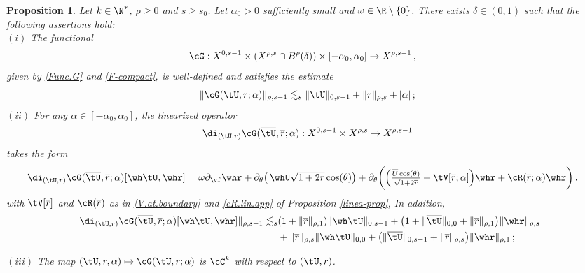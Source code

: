 \documentclass[a4paper,reqno,10pt]{article}
\newtheorem{pro}{Proposition}[section]
\newcommand{\pa}{\partial}
\begin{document}
\begin{pro}\label{prop-Functional-est}
	Let $k\in\N^*$, $\rho\geq 0$ and $s\geq s_0$. Let $\alpha_{0}>0$ sufficiently small and $\omega \in \R\setminus \{0\}$. There exists $\delta\in(0,1)$ such that the following assertions hold: 
	\\[1mm]
	\noindent $(i)$
	The functional
	\begin{equation*}
		\begin{aligned}
			&\cG: X^{0,s-1} \times (X^{\rho,s}\cap B^{\rho}(\delta)) \times [-\alpha_{0},\alpha_{0}] \to X^{\rho,s-1}\,, 
		\end{aligned}
	\end{equation*}
	given by  \eqref{Func.G} and \eqref{F-compact}, is well-defined and satisfies the estimate
	\begin{equation}
		\| \cG(\tU,r;\alpha) \|_{\rho,s-1} \lesssim_{s} \| \tU \|_{0,s-1} + \| r \|_{\rho,s} + |\alpha|  \,; 
	\end{equation}
	\noindent $(ii)$ For any $\alpha\in[-\alpha_{0},\alpha_{0}]$, the linearized  operator 
    $$
    \di_{(\tU,r)} \cG( \overline\tU, \overline{r}; \alpha) : X^{0,s-1} \times X^{\rho,s} \to X^{\rho,s-1}
    $$
    takes the form
	\begin{equation}
		\begin{aligned}
			&\di_{(\tU,r)} \cG( \overline\tU, \overline{r}; \alpha) [\wh\tU,\whr] =  \omega \pa_{\vf}\whr +  \pa_{\theta}\big( \,\whU\sqrt{1+2 r} \cos(\theta) \big) + \pa_{\theta}\bigg( \Big( \tfrac{ \overline{U} \cos(\theta)}{\sqrt{1+2 \overline{r}}} + \tV[ \overline{r};\alpha] \Big) \whr +  \cR(\overline{r};\alpha) \whr \bigg) \,,
		\end{aligned}
	\end{equation}
	with $\tV[\overline r]$ and $\cR(\overline r)$ as in \eqref{V.at.boundary} and \eqref{cR.lin.app} of Proposition \ref{linea-prop}, In addition, 
	\begin{align*}
		\| \di_{(\tU,r)} \cG( \overline\tU, \overline{r}; \alpha) [\wh\tU,\whr] \|_{\rho,s-1} \lesssim_{s} &(1+\| \overline r\|_{\rho,1}) \| \wh\tU \|_{0,s-1} + \big(1+ \| \overline \tU \|_{0,0} + \| \overline r \|_{\rho,1} \big)\| \whr \|_{\rho,s} \\
        &+\| \overline r\|_{\rho,s} \| \wh\tU \|_{0,0} + \big( \| \overline \tU \|_{0,s-1} + \| \overline r \|_{\rho,s} \big)\| \whr \|_{\rho,1}\,;
	\end{align*}

	\noindent $(iii)$ The map $(\tU,r,\alpha) \mapsto \cG(\tU,r;\alpha)$ is $\cC^k$ with respect to $(\tU,r)$.
\end{pro}
\end{document}
